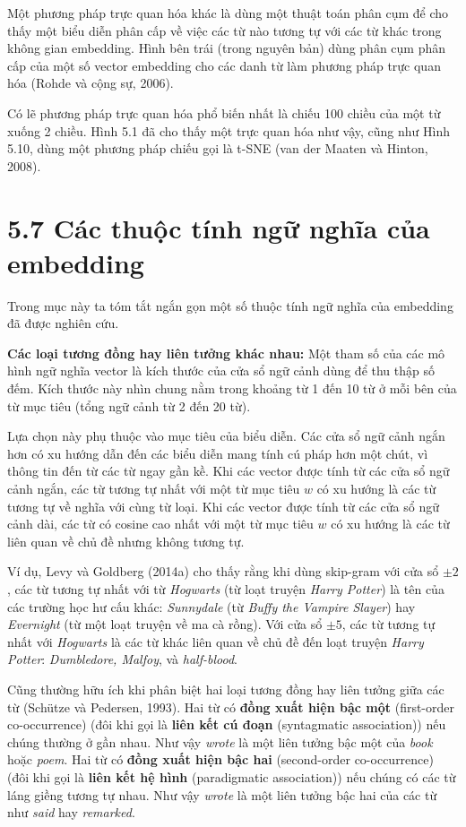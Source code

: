 Một phương pháp trực quan hóa khác là dùng một thuật toán phân cụm để cho thấy một biểu diễn phân cấp về việc các từ nào tương tự với các từ khác trong không gian embedding. Hình bên trái (trong nguyên bản) dùng phân cụm phân cấp của một số vector embedding cho các danh từ làm phương pháp trực quan hóa (Rohde và cộng sự, 2006).

Có lẽ phương pháp trực quan hóa phổ biến nhất là chiếu 100 chiều của một từ xuống 2 chiều. Hình 5.1 đã cho thấy một trực quan hóa như vậy, cũng như Hình 5.10, dùng một phương pháp chiếu gọi là t-SNE (van der Maaten và Hinton, 2008).

\section{5.7 Các thuộc tính ngữ nghĩa của embedding}

Trong mục này ta tóm tắt ngắn gọn một số thuộc tính ngữ nghĩa của embedding đã được nghiên cứu.

\textbf{Các loại tương đồng hay liên tưởng khác nhau:} Một tham số của các mô hình ngữ nghĩa vector là kích thước của cửa sổ ngữ cảnh dùng để thu thập số đếm. Kích thước này nhìn chung nằm trong khoảng từ 1 đến 10 từ ở mỗi bên của từ mục tiêu (tổng ngữ cảnh từ 2 đến 20 từ).

Lựa chọn này phụ thuộc vào mục tiêu của biểu diễn. Các cửa sổ ngữ cảnh ngắn hơn có xu hướng dẫn đến các biểu diễn mang tính cú pháp hơn một chút, vì thông tin đến từ các từ ngay gần kề. Khi các vector được tính từ các cửa sổ ngữ cảnh ngắn, các từ tương tự nhất với một từ mục tiêu $w$ có xu hướng là các từ tương tự về nghĩa với cùng từ loại. Khi các vector được tính từ các cửa sổ ngữ cảnh dài, các từ có cosine cao nhất với một từ mục tiêu $w$ có xu hướng là các từ liên quan về chủ đề nhưng không tương tự.

Ví dụ, Levy và Goldberg (2014a) cho thấy rằng khi dùng skip-gram với cửa sổ $\pm 2$, các từ tương tự nhất với từ \emph{Hogwarts} (từ loạt truyện \emph{Harry Potter}) là tên của các trường học hư cấu khác: \emph{Sunnydale} (từ \emph{Buffy the Vampire Slayer}) hay \emph{Evernight} (từ một loạt truyện về ma cà rồng). Với cửa sổ $\pm 5$, các từ tương tự nhất với \emph{Hogwarts} là các từ khác liên quan về chủ đề đến loạt truyện \emph{Harry Potter}: \emph{Dumbledore, Malfoy}, và \emph{half-blood}.

Cũng thường hữu ích khi phân biệt hai loại tương đồng hay liên tưởng giữa các từ (Schütze và Pedersen, 1993). Hai từ có \textbf{đồng xuất hiện bậc một} (first-order co-occurrence) (đôi khi gọi là \textbf{liên kết cú đoạn} (syntagmatic association)) nếu chúng thường ở gần nhau. Như vậy \emph{wrote} là một liên tưởng bậc một của \emph{book} hoặc \emph{poem}. Hai từ có \textbf{đồng xuất hiện bậc hai} (second-order co-occurrence) (đôi khi gọi là \textbf{liên kết hệ hình} (paradigmatic association)) nếu chúng có các từ láng giềng tương tự nhau. Như vậy \emph{wrote} là một liên tưởng bậc hai của các từ như \emph{said} hay \emph{remarked}.

